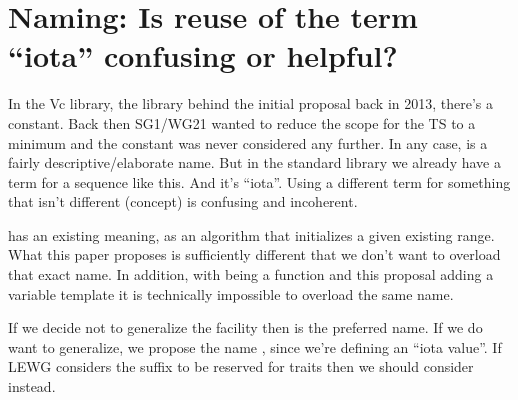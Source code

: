 \section{Naming: Is reuse of the term “iota” confusing or helpful?}

In the Vc library, the library behind the initial proposal back in 2013,
there's a  constant.
Back then SG1/WG21 wanted to reduce the scope for the TS to a minimum and the
constant was never considered any further.
In any case,  is a fairly descriptive/elaborate name.
But in the standard library we already have a term for a sequence like this.
And it's “iota”.
Using a different term for something that isn't different (concept) is
confusing and incoherent.

 has an existing meaning, as an algorithm that initializes a
given existing range.
What this paper proposes is sufficiently different that we don't want to
overload that exact name.
In addition, with  being a function and this proposal adding a
variable template it is technically impossible to overload the same name.

If we decide not to generalize the facility then \stdsimd{} is the
preferred name.
If we do want to generalize, we propose the name \std{}, since we're
defining an “iota value”.
If LEWG considers the  suffix to be reserved for traits then we should
consider \std{} instead.

